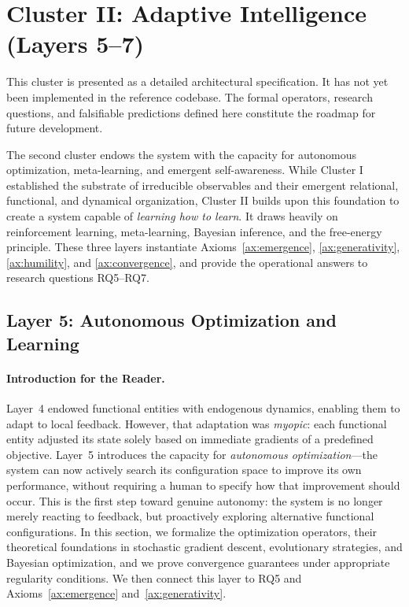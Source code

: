 \section{Cluster II: Adaptive Intelligence (Layers 5--7)}
\label{sec:cluster2}

\begin{tcolorbox}[colback=gray!10, colframe=gray!50, title=Status: Architectural Specification]
This cluster is presented as a detailed architectural specification. It has not yet been implemented in the reference codebase. The formal operators, research questions, and falsifiable predictions defined here constitute the roadmap for future development.
\end{tcolorbox}

The second cluster endows the system with the capacity for autonomous optimization, meta-learning, and emergent self-awareness. While Cluster I established the substrate of irreducible observables and their emergent relational, functional, and dynamical organization, Cluster II builds upon this foundation to create a system capable of \emph{learning how to learn}. It draws heavily on reinforcement learning, meta-learning, Bayesian inference, and the free-energy principle. These three layers instantiate Axioms~\ref{ax:emergence}, \ref{ax:generativity}, \ref{ax:humility}, and \ref{ax:convergence}, and provide the operational answers to research questions RQ5--RQ7.

\subsection{Layer 5: Autonomous Optimization and Learning}
\label{subsec:layer5}

\paragraph{Introduction for the Reader.}
Layer~4 endowed functional entities with endogenous dynamics, enabling them to adapt to local feedback. However, that adaptation was \emph{myopic}: each functional entity adjusted its state solely based on immediate gradients of a predefined objective. Layer~5 introduces the capacity for \emph{autonomous optimization}---the system can now actively search its configuration space to improve its own performance, without requiring a human to specify how that improvement should occur. This is the first step toward genuine autonomy: the system is no longer merely reacting to feedback, but proactively exploring alternative functional configurations. In this section, we formalize the optimization operators, their theoretical foundations in stochastic gradient descent, evolutionary strategies, and Bayesian optimization, and we prove convergence guarantees under appropriate regularity conditions. We then connect this layer to RQ5 and Axioms~\ref{ax:emergence} and~\ref{ax:generativity}.

